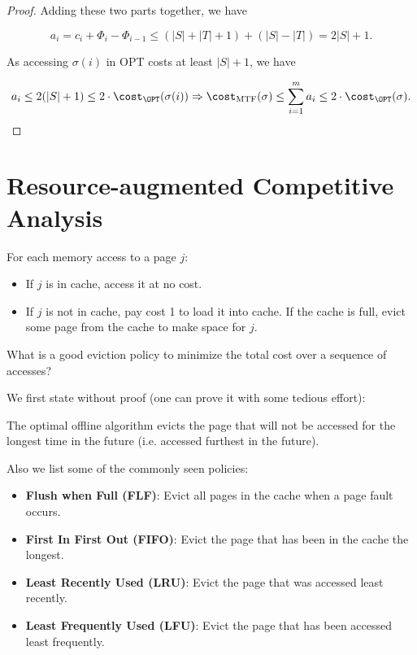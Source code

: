 \begin{proof}
	Adding these two parts together, we have

	\[ a_i = c_i + \Phi_i - \Phi_{i-1} \leq (|S| + |T| + 1) + (|S| - |T|) = 2|S| + 1. \]

	As accessing $\sigma(i)$ in OPT costs at least $|S| + 1$, we have

	\[ a_i \leq 2(|S| + 1) \leq 2 \cdot \cost_{\OPT}(\sigma(i)) \Rightarrow \cost_{\text{MTF}}(\sigma) \leq \sum_{i=1}^m a_i \leq 2 \cdot \cost_{\OPT}(\sigma). \]
\end{proof}

\section{Resource-augmented Competitive Analysis}

\begin{problem}
For each memory access to a page $j$:
\begin {itemize}
\item If $j$ is in cache, access it at no cost.
\item If $j$ is not in cache, pay cost 1 to load it into cache. If the cache is full, evict some page from the cache to make space for $j$.
\end{itemize}
What is a good eviction policy to minimize the total cost over a sequence of accesses?
\end{problem}

We first state without proof (one can prove it with some tedious effort):

\begin{theorem}
	The optimal offline algorithm evicts the page that will not be accessed for the longest time in the future (i.e. accessed furthest in the future).
\end{theorem}

Also we list some of the commonly seen policies:

\begin{itemize}
	\item \textbf{Flush when Full (FLF)}: Evict all pages in the cache when a page fault occurs.
	\item \textbf{First In First Out (FIFO)}: Evict the page that has been in the cache the longest.
	\item \textbf{Least Recently Used (LRU)}: Evict the page that was accessed least recently.
	\item \textbf{Least Frequently Used (LFU)}: Evict the page that has been accessed least frequently.
\end{itemize}

